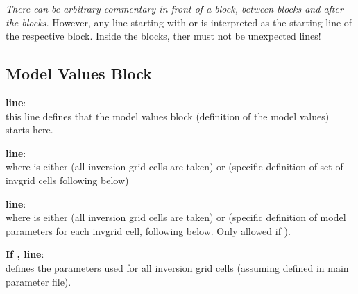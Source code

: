 \emph{There can be arbitrary commentary in front of a block, between blocks and after the blocks.} However, 
any line starting with  or  is interpreted as the starting line
of the respective block. Inside the blocks, ther must not be unexpected lines!




\subsection{Model Values Block}

{\bf line}: \\
this line defines that the model values block (definition of the model values) starts here. 

{\bf line}: \\
where  is either  (all inversion grid cells are taken) or  
(specific definition of set of invgrid cells following below)

{\bf line}: \\
where  is either  (all inversion grid cells are taken) or  
(specific definition of model parameters for each invgrid cell, following below. Only allowed if 
). 

{\bf If , line}: \\
defines the parameters used for all inversion grid cells (assuming  defined in main parameter file).

